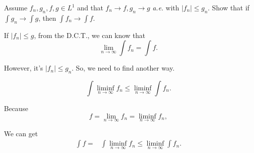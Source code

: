 \documentclass[11pt]{beamer}
\newenvironment{exercise}[1][\textsc{Exercise }\thesection.\refstepcounter{exercise}\theexercise]{\begin{tcolorbox}[colback=black!15, colframe=black!80, breakable, title=\textsc{Exercise }#1]}{\end{tcolorbox}}
\newenvironment{other}[1][\textsc{Exercise }\thesection.\refstepcounter{exercise}\theexercise]{\begin{tcolorbox}[colback=black!15, colframe=black!80, breakable, title=#1]}{\end{tcolorbox}}
\begin{document}
    \begin{frame}[plain]
        \begin{exercise}[(5)] 
            Assume $f_{n}, g_{n}, f, g \in L^{1}$ and that $f_{n} \rightarrow f, g_{n} \rightarrow g$ \emph{a.e.} with $\left|f_{n}\right| \leqslant g_{n}$. Show that if $\int g_{n} \rightarrow \int g$, then $\int f_{n} \rightarrow \int f$. 
        \end{exercise}

        \vspace*{10pt}
        If $|f_n|\leqslant g$, from the D.C.T., we can know that 
        \[
            \lim_{n\to\infty}\int f_n = \int f. 
        \]

        \vspace*{15pt}However, it's $|f_n|\leqslant g_n$. So, we need to find another way. 

        \vspace*{75pt}
    \end{frame}

    \begin{frame}[plain]
        \begin{other}[Fatou's lemma: ] 
            \[
                \int \liminf _{n\to \infty }f_{n}\leqslant \liminf _{n\to \infty }\int f_{n}. 
            \]
        \end{other}
        \vspace*{10pt}
        Because
        \[
            f=\lim_{n\to\infty}f_n=\liminf_{n\to\infty}f_n, 
        \]
        
        \vspace*{15pt}
        We can get 
        \begin{equation*}
            \begin{aligned}
                \int f = & \int \liminf_{n\to\infty} f_n
                \leqslant \liminf_{n\to\infty} \int f_n. 
            \end{aligned}
        \end{equation*}
        \vspace*{50pt}
    \end{frame}
\end{document}
